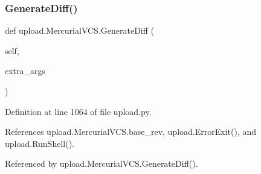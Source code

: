 \subsubsection{\texorpdfstring{Generate\+Diff()}{GenerateDiff()}\hspace{0.1cm}{\footnotesize\ttfamily [1/2]}}
{\footnotesize\ttfamily def upload.\+Mercurial\+V\+C\+S.\+Generate\+Diff (\begin{DoxyParamCaption}\item[{}]{self,  }\item[{}]{extra\+\_\+args }\end{DoxyParamCaption})}



Definition at line 1064 of file upload.\+py.



References upload.\+Mercurial\+V\+C\+S.\+base\+\_\+rev, upload.\+Error\+Exit(), and upload.\+Run\+Shell().



Referenced by upload.\+Mercurial\+V\+C\+S.\+Generate\+Diff().


